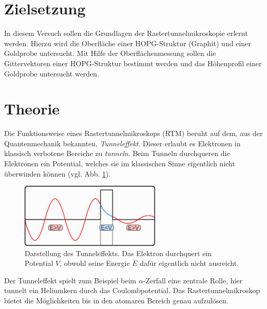 \setcounter{page}{1}
\section*{Zielsetzung}
In diesem Versuch sollen die Grundlagen der Rastertunnelmikroskopie
erlernt werden.
Hierzu wird die Oberfläche einer HOPG-Struktur (Graphit) und einer
Goldprobe untersucht. Mit Hilfe der Oberflächenmessung sollen die Gittervektoren
einer HOPG-Struktur bestimmt werden und das Höhenprofil einer Goldprobe untersucht werden.

\section{Theorie}
Die Funktionsweise eines Rastertunnelmikroskops (RTM) beruht auf dem, aus der Quantenmechanik bekannten, %
\emph{Tunneleffekt}. Dieser erlaubt es Elektronen in klassisch verbotene Bereiche zu \emph{tunneln}. %
Beim Tunneln durchqueren die Elektronen ein Potential, welches sie im klassischen Sinne
eigentlich nicht überwinden können (vgl. Abb. \ref{fig: tunneleffekt}).
\begin{figure}[!h]
  \centering
  \includegraphics[width=0.6\textwidth]{./pics/tunelleffekt.png}
  \caption{Darstellung des Tunneleffekts.
  Das Elektron durchquert ein Potential $V$, obwohl seine Energie $E$ dafür eigentlich nicht ausreicht. \cite{tunnel}}
  \label{fig: tunneleffekt}
\end{figure}
Der Tunneleffekt spielt zum Beispiel beim $\alpha$-Zerfall eine zentrale Rolle, hier tunnelt ein Heliumkern durch das Coulombpotential. %
Das Rastertunnelmikroskop bietet die Möglichkeiten bis in den atomaren Bereich genau aufzulösen\cite{aufl}. %

